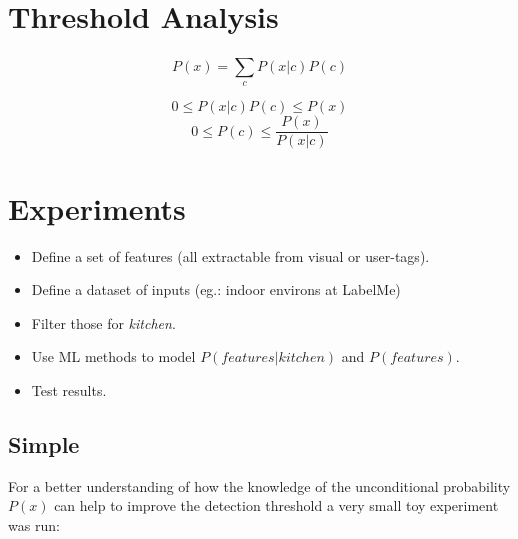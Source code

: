 \documentclass[a4paper]{article}
\begin{document}
\section{Threshold Analysis}
\label{sec:threshold-analysis}

\begin{equation}P(x) = \sum_{c}^{} P(x|c) P(c)\end{equation}

\begin{equation}0 \le P(x|c) P(c) \le P(x)\end{equation}
\begin{equation}0 \le P(c) \le \frac{P(x)}{P(x|c)}\end{equation}



\section{Experiments}
\label{sec:experiment}
\begin{itemize}
\item Define a set of features (all extractable from visual or user-tags).
\item Define a dataset of inputs (eg.: indoor environs at LabelMe)
\item Filter those for \emph{kitchen}.
\item Use ML methods to model $P(features | kitchen)$ and $P(features)$.
\item Test results.
\end{itemize}


\subsection{Simple}
\label{sec:simple-experiment}

For a better understanding of how the knowledge of the unconditional probability $P(x)$ can help to improve the detection threshold
a very small toy experiment was run:
\end{document}
